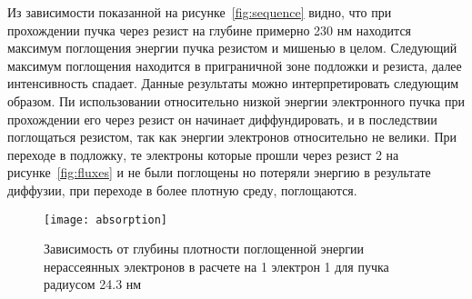 Из зависимости показанной на рисунке~\ref{fig:sequence} видно, что при прохождении пучка через резист на глубине примерно 230 нм находится максимум поглощения энергии пучка резистом и мишенью в целом. Следующий максимум поглощения находится в приграничной зоне подложки и резиста, далее интенсивность спадает. Данные результаты можно интерпретировать следующим образом. Пи использовании относительно низкой энергии электронного пучка при прохождении его через резист он начинает диффундировать, и в последствии поглощаться резистом, так как энергии электронов относительно не велики. При переходе в подложку, те электроны которые прошли через резист 2 на рисунке~\ref{fig:fluxes} и не были поглощены но потеряли энергию в результате диффузии, при переходе в более плотную среду, поглощаются.
\begin{figure}[h]
    \center
    \texttt{[image: absorption]}
    \caption{Зависимость от глубины плотности поглощенной энергии нерассеянных электронов в расчете на 1 электрон 1 для пучка радиусом 24.3 нм}
    \label{fig:absorption}
\end{figure}

